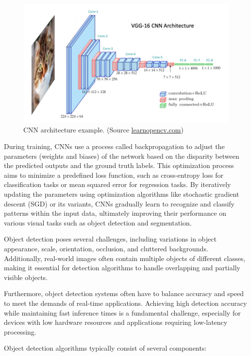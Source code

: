 \begin{figure}
  \centering
  \includegraphics[width=\linewidth]{text/chapter_03/imgs/CNN}
  \caption{CNN architecture example. (Source \href{https://learnopencv.com/understanding-convolutional-neural-networks-cnn/}{learnopencv.com})}
  \label{fig:CNNArchitecture}
\end{figure}
During training, CNNs use a process called backpropagation to adjust the parameters (weights and biases) of the network based on the disparity between the predicted outputs and the ground truth labels. This optimization process aims to minimize a predefined loss function, such as cross-entropy loss for classification tasks or mean squared error for regression tasks. By iteratively updating the parameters using optimization algorithms like stochastic gradient descent (SGD) or its variants, CNNs gradually learn to recognize and classify patterns within the input data, ultimately improving their performance on various visual tasks such as object detection and segmentation.


Object detection poses several challenges, including variations in object appearance, scale, orientation, occlusion, and cluttered backgrounds. Additionally, real-world images often contain multiple objects of different classes, making it essential for detection algorithms to handle overlapping and partially visible objects.

Furthermore, object detection systems often have to balance accuracy and speed to meet the demands of real-time
applications. Achieving high detection accuracy while maintaining fast inference times is a fundamental challenge,
especially for devices with low hardware resources and applications requiring low-latency processing.

Object detection algorithms typically consist of several components:

